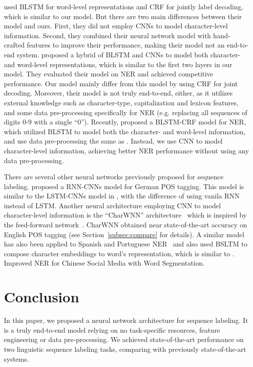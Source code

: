 \documentclass[11pt]{article}
\begin{document}
 used BLSTM for word-level representations and CRF for jointly label decoding, which is similar to our model. But there are two main differences between their model and ours. First, they did not employ CNNs to model character-level information. Second, they combined their neural network model with hand-crafted features to improve their performance, making their model not an end-to-end system.  proposed a hybrid of BLSTM and CNNs to model both character- and word-level representations, which is similar to the first two layers in our model. They evaluated their model on NER and achieved competitive performance. Our model mainly differ from this model by using CRF for joint decoding. Moreover, their model is not truly end-to-end, either, as it utilizes external knowledge such as character-type, capitalization and lexicon features,  and some data pre-processing specifically for NER (e.g. replacing all sequences of digits 0-9 with a single ``0''). Recently,  proposed a BLSTM-CRF model for NER, which utilized BLSTM to model both the character- and word-level information, and use data pre-processing the same as . Instead, we use CNN to model character-level information, achieving better NER performance without using any data pre-processing.

There are several other neural networks previously proposed for sequence labeling.  proposed a RNN-CNNs model for German POS tagging. This model is similar to the LSTM-CNNs model in , with the difference of using vanila RNN instead of LSTM. Another neural architecture employing CNN to model character-level information is the ``CharWNN'' architecture~\cite{santos2014learning} which is inspired by the feed-forward network~\cite{collobert2011natural}. CharWNN obtained near state-of-the-art accuracy on English POS tagging (see Section~\ref{subsec:compare} for details). A similar model has also been applied to Spanish and Portuguese NER~\cite{dos2015boosting}  and  also used BSLTM to compose character embeddings to word's representation, which is similar to .  Improved NER for Chinese Social Media with Word Segmentation.

\section{Conclusion}
In this paper, we proposed a neural network architecture for sequence labeling. It is a truly end-to-end model relying on no task-specific resources, feature engineering or data pre-processing. We achieved state-of-the-art performance on two linguistic sequence labeling tasks, comparing with previously state-of-the-art systems.
\end{document}
